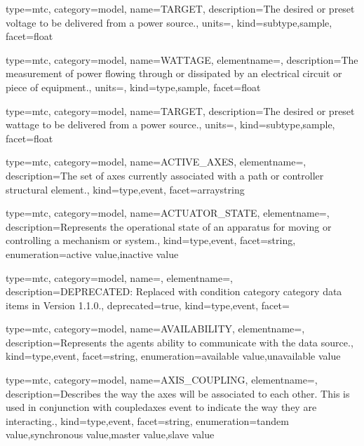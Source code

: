 {
  type=mtc,
  category=model,
  name={TARGET},
  description={The desired or preset voltage to be delivered from a power source.},
  units=,
  kind={subtype,sample},
  facet={\gls{float}}
}


{
  type=mtc,
  category=model,
  name={WATTAGE},
  elementname=,
  description={The measurement of power flowing through or dissipated by an electrical circuit or piece of equipment.},
  units=,
  kind={type,sample},
  facet={\gls{float}}
}


{
  type=mtc,
  category=model,
  name={TARGET},
  description={The desired or preset wattage to be delivered from a power source.},
  units=,
  kind={subtype,sample},
  facet={\gls{float}}
}


{
  type=mtc,
  category=model,
  name={ACTIVE\_AXES},
  elementname=,
  description={The set of axes currently associated with a \gls{path} or \gls{controller} \gls{structural element}.},
  kind={type,event},
  facet={\gls{arraystring}}
}


{
  type=mtc,
  category=model,
  name={ACTUATOR\_STATE},
  elementname=,
  description={Represents the operational state of an apparatus for moving or controlling a mechanism or system.},
  kind={type,event},
  facet={\gls{string}},
  enumeration={\gls{active value},\gls{inactive value}}
}


{
  type=mtc,
  category=model,
  name=,
  elementname=,
  description={DEPRECATED: Replaced with \gls{condition category} category data items in Version 1.1.0.},
  deprecated={true},
  kind={type,event},
  facet={}
}


{
  type=mtc,
  category=model,
  name={AVAILABILITY},
  elementname=,
  description={Represents the \gls{agent}s ability to communicate with the data source.},
  kind={type,event},
  facet={\gls{string}},
  enumeration={\gls{available value},\gls{unavailable value}}
}


{
  type=mtc,
  category=model,
  name={AXIS\_COUPLING},
  elementname=,
  description={Describes the way the axes will be associated to each other. This is used in conjunction with \gls{coupledaxes event} to indicate the way they are interacting.},
  kind={type,event},
  facet={\gls{string}},
  enumeration={\gls{tandem value},\gls{synchronous value},\gls{master value},\gls{slave value}}
}


